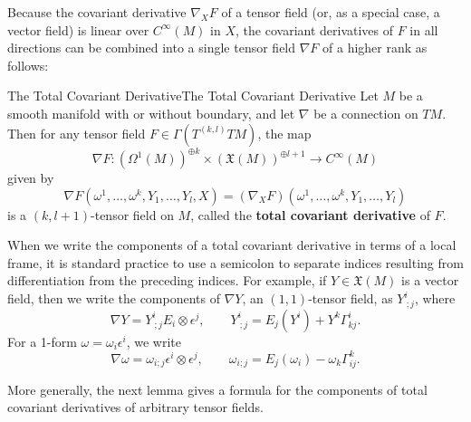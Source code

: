 \documentclass[../main.tex]{subfiles}
\begin{document}
Because the covariant derivative $\nabla_X F$ of a tensor field (or, as a special case, a vector field) is linear over $C^{\infty}(M)$ in $X$, the covariant derivatives of $F$ in all directions can be combined into a single tensor field $\nabla F$ of a higher rank as follows:

\begin{proposition}{The Total Covariant Derivative}{The Total Covariant Derivative}
	Let $M$ be a smooth manifold with or without boundary, and let $\nabla$ be a connection on $TM$. Then for any tensor field $F \in \Gamma(T^{(k, l)} TM)$, the map
	\begin{equation}
		\nabla F: (\Omega^1(M))^{\oplus k} \times (\mathfrak{X}(M))^{\oplus l+1} \to C^{\infty}(M)
	\end{equation}
	given by
	\begin{equation}
		\nabla F(\omega^1, \ldots, \omega^k, Y_1, \ldots, Y_l, X) = (\nabla_X F)(\omega^1, \ldots, \omega^k, Y_1, \ldots, Y_l)
	\end{equation}
	is a $(k,l+1)$-tensor field on $M$, called the \textbf{total covariant derivative} of $F$.
\end{proposition}

When we write the components of a total covariant derivative in terms of a local frame, it is standard practice to use a semicolon to separate indices resulting from differentiation from the preceding indices. For example, if $Y \in \mathfrak{X}(M)$ is a vector field, then we write the components of $\nabla Y$, an $(1, 1)$-tensor field, as $Y^i_{\ ;j}$, where
\begin{equation}
	\nabla Y = Y^i_{\ ;j} E_i \otimes \epsilon^j, \qquad Y^i_{\ ;j} = E_j(Y^i) + Y^k \Gamma_{kj}^i.
\end{equation}
For a 1-form $\omega = \omega_i \epsilon^i$, we write
\begin{equation}
	\nabla \omega = \omega_{i;j} \epsilon^i \otimes \epsilon^j, \qquad \omega_{i;j} = E_j(\omega_i) - \omega_k \Gamma_{ij}^k.
\end{equation}

More generally, the next lemma gives a formula for the components of total covariant derivatives of arbitrary tensor fields.
\end{document}
